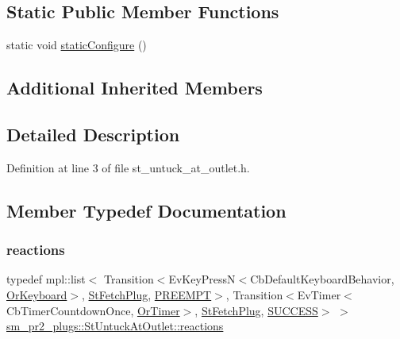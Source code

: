 \subsection*{Static Public Member Functions}
\begin{DoxyCompactItemize}
\item 
static void \hyperlink{structsm__pr2__plugs_1_1StUntuckAtOutlet_a7ec4bd71b7f8b5ce3b5229111c9afd2d}{static\+Configure} ()
\end{DoxyCompactItemize}
\subsection*{Additional Inherited Members}


\subsection{Detailed Description}


Definition at line 3 of file st\+\_\+untuck\+\_\+at\+\_\+outlet.\+h.



\subsection{Member Typedef Documentation}
\mbox{\label{structsm__pr2__plugs_1_1StUntuckAtOutlet_a77b0bad04ff5db4fc1a9b8557a435211}} 
\subsubsection{\texorpdfstring{reactions}{reactions}}
{\footnotesize\ttfamily typedef mpl\+::list$<$ Transition$<$Ev\+Key\+PressN$<$Cb\+Default\+Keyboard\+Behavior, \hyperlink{classsm__pr2__plugs_1_1OrKeyboard}{Or\+Keyboard}$>$, \hyperlink{structsm__pr2__plugs_1_1StFetchPlug}{St\+Fetch\+Plug}, \hyperlink{classPREEMPT}{P\+R\+E\+E\+M\+PT}$>$, Transition$<$Ev\+Timer$<$Cb\+Timer\+Countdown\+Once, \hyperlink{classsm__pr2__plugs_1_1OrTimer}{Or\+Timer}$>$, \hyperlink{structsm__pr2__plugs_1_1StFetchPlug}{St\+Fetch\+Plug}, \hyperlink{classSUCCESS}{S\+U\+C\+C\+E\+SS}$>$ $>$ \hyperlink{structsm__pr2__plugs_1_1StUntuckAtOutlet_a77b0bad04ff5db4fc1a9b8557a435211}{sm\+\_\+pr2\+\_\+plugs\+::\+St\+Untuck\+At\+Outlet\+::reactions}}



